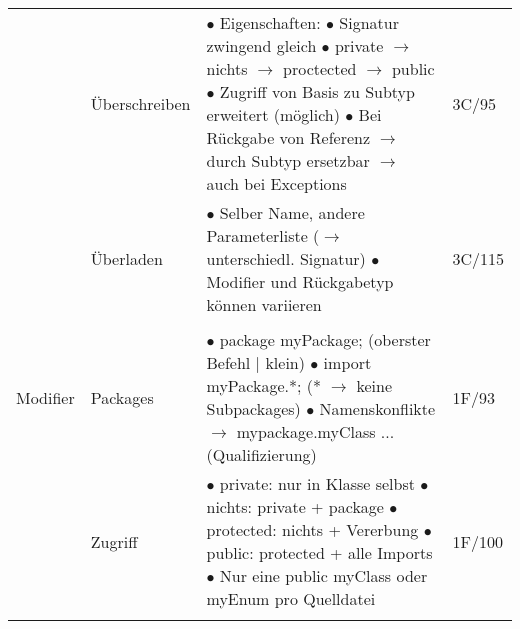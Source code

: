 \documentclass[11pt,a4paper]{article}
\begin{document}
\begin{center}
\begin{longtable}[h]{ | p{2.3cm} | p{2.3cm} | p{12.6cm} | p{1.2cm} | }
	& Überschreiben & \makecell[l]{$\bullet$ Eigenschaften: \\ \hspace{0,4cm} $\bullet$ Signatur zwingend gleich \\ 
	\hspace{0.4cm} $\bullet$ private $\rightarrow$ nichts $\rightarrow$ proctected $\rightarrow$ public 
	\\ \hspace{0.8cm} $\bullet$ Zugriff von Basis zu Subtyp erweitert (möglich) \\ 
	\hspace{0.4cm} $\bullet$ Bei Rückgabe von Referenz $\rightarrow$ durch Subtyp ersetzbar \\ 
	\hspace{0.8cm}$\rightarrow$ auch bei Exceptions} & 3C/95 \\ \cline{2-4}
	
	& Überladen & \makecell[l]{$\bullet$ Selber Name, andere Parameterliste ($\rightarrow$ unterschiedl. Signatur) \\ 
	$\bullet$ Modifier und Rückgabetyp können variieren } & 3C/115 \\ \cline{2-4}
	\hline    
    
    
    
	\multicolumn{3}{c}{} \\ 
	\hline   
	
	
	
	{\large Modifier} & Packages & \makecell[l]{$\bullet$ package myPackage; (oberster Befehl | klein)\\ 
	$\bullet$ import myPackage.*; (* $\rightarrow$ keine Subpackages) \\
	$\bullet$ Namenskonflikte $\rightarrow$ mypackage.myClass ... (Qualifizierung)}& 1F/93 \\ \cline{2-4}
	
	& Zugriff & \makecell[l]{$\bullet$ private: nur in Klasse selbst \\ $\bullet$ nichts: private + package \\ 
	$\bullet$ protected: nichts + Vererbung \\ 
	$\bullet$ public: protected + alle Imports \\
	$\bullet$ Nur eine public myClass oder myEnum pro Quelldatei} & 1F/100 \\ 
	\hline
	
	
	
	\multicolumn{3}{c}{} \\ 
	\hline 
	

\end{longtable}
\end{center}
\end{document}
